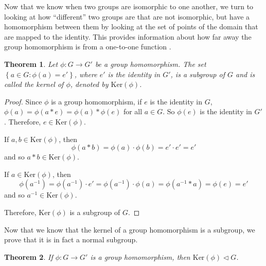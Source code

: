 \documentclass[
]{book}
\newtheorem{theorem}{Theorem}[chapter]
\theoremstyle{definition}
\theoremstyle{definition}
\theoremstyle{definition}
\theoremstyle{definition}
\theoremstyle{remark}
\begin{document}
Now that we know when two groups are isomorphic to one another, we turn to looking at how ``different'' two groups are that are not isomorphic, but have a homomorphism between them by looking at the set of points of the domain that are mapped to the identity. This provides information about how far away the group homomorphism is from a one-to-one function .

\begin{theorem}
Let \(\phi: G \rightarrow G'\) be a group homomorphism. The set \(\left\{ a\in G : \phi(a)=e' \right\}\), where \(e'\) is the identity in \(G'\), is a subgroup of \(G\) and is called the kernel of \(\phi\), denoted by \(\mbox{Ker}(\phi)\).
\end{theorem}

\begin{proof}
Since \(\phi\) is a group homomorphism, if \(e\) is the identity in \(G\), \(\phi(a)=\phi(a*e)=\phi(a)*\phi(e)\) for all \(a\in G\). So \(\phi(e)\) is the identity in \(G'\). Therefore, \(e \in \mbox{Ker}(\phi)\).

If \(a,b \in \mbox{Ker}(\phi)\), then \[ \phi(a*b)=\phi(a) \cdot \phi(b) = e' \cdot e' = e' \] and so \(a*b \in \mbox{Ker}(\phi)\).

If \(a\in \mbox{Ker}(\phi)\), then \[\phi(a^{-1}) = \phi(a^{-1})\cdot e' = \phi(a^{-1})\cdot \phi(a) = \phi(a^{-1}*a) = \phi(e)=e'\] and so \(a^{-1}\in \mbox{Ker}(\phi)\).

Therefore, \(\mbox{Ker}(\phi)\) is a subgroup of \(G\).
\end{proof}

Now that we know that the kernel of a group homomorphism is a subgroup, we prove that it is in fact a normal subgroup.

\begin{theorem}
If \(\phi:G \rightarrow G'\) is a group homomorphism, then \(\mbox{Ker}(\phi) \vartriangleleft G\).
\end{theorem}
\end{document}
